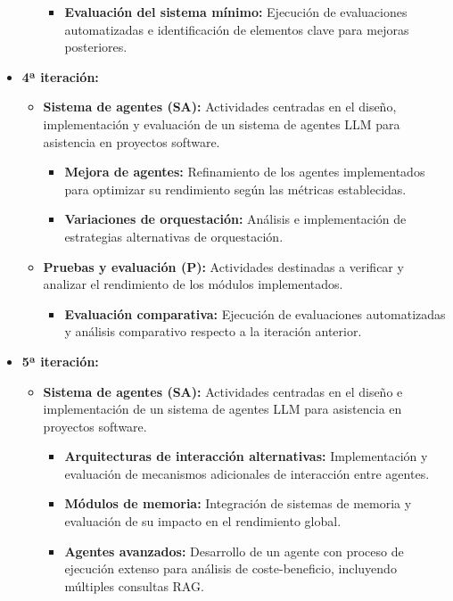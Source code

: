 \begin{itemize}
\begin{itemize}
\begin{itemize}
          \item\textbf{Evaluación del sistema mínimo: } Ejecución de evaluaciones automatizadas e identificación de elementos clave para mejoras posteriores.
        \end{itemize}
    \end{itemize}
  \item\textbf{4ª iteración:}
    \begin{itemize}
      \item\textbf{Sistema de agentes (SA):} Actividades centradas en el diseño, implementación y evaluación de un sistema de agentes LLM para asistencia en proyectos software.
        \begin{itemize}
          \item\textbf{Mejora de agentes:} Refinamiento de los agentes implementados para optimizar su rendimiento según las métricas establecidas.
          \item\textbf{Variaciones de orquestación:} Análisis e implementación de estrategias alternativas de orquestación. 
        \end{itemize}
      \item\textbf{Pruebas y evaluación (P):} Actividades destinadas a verificar y analizar el rendimiento de los módulos implementados.
        \begin{itemize}
          \item\textbf{Evaluación comparativa:} Ejecución de evaluaciones automatizadas y análisis comparativo respecto a la iteración anterior.
        \end{itemize}
    \end{itemize}
  \item\textbf{5ª iteración:}
    \begin{itemize}
      \item\textbf{Sistema de agentes (SA):} Actividades centradas en el diseño e implementación de un sistema de agentes LLM para asistencia en proyectos software.
        \begin{itemize}
          \item\textbf{Arquitecturas de interacción alternativas:} Implementación y evaluación de mecanismos adicionales de interacción entre agentes.
          \item\textbf{Módulos de memoria:} Integración de sistemas de memoria y evaluación de su impacto en el rendimiento global. 
          \item\textbf{Agentes avanzados:} Desarrollo de un agente con proceso de ejecución extenso para análisis de coste-beneficio, incluyendo múltiples consultas RAG. 

\end{itemize}
\end{itemize}
\end{itemize}
